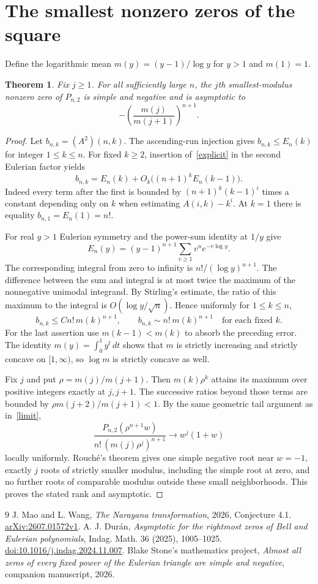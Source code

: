 \documentclass[11pt]{article}
\newtheorem{theorem}{Theorem}
\begin{document}
\section{The smallest nonzero zeros of the square}
Define the logarithmic mean $m(y)=(y-1)/\log y$ for $y>1$ and $m(1)=1$.
\begin{theorem}\label{smallest}
Fix $j\ge1$. For all sufficiently large $n$, the $j$th smallest-modulus nonzero zero of $P_{n,2}$ is simple and negative and is asymptotic to
\[
 -\left(\frac{m(j)}{m(j+1)}\right)^{n+1} .
\]
\end{theorem}
\begin{proof}
Let $b_{n,k}=(A^2)(n,k)$. The ascending-run injection gives $b_{n,k}\le E_n(k)$ for integer $1\le k\le n$. For fixed $k\ge2$, insertion of~\eqref{explicit} in the second Eulerian factor yields
\[
 b_{n,k}=E_n(k)+O_k\big((n+1)^k E_n(k-1)\big).
\]
Indeed every term after the first is bounded by $(n+1)^k(k-1)^i$ times a constant depending only on $k$ when estimating $A(i,k)-k^i$. At $k=1$ there is equality $b_{n,1}=E_n(1)=n!$.

For real $y>1$ Eulerian symmetry and the power-sum identity at $1/y$ give
\[
 E_n(y)=(y-1)^{n+1}\sum_{v\ge1}v^n e^{-v\log y} .
\]
The corresponding integral from zero to infinity is $n!/(\log y)^{n+1}$. The difference between the sum and integral is at most twice the maximum of the nonnegative unimodal integrand. By Stirling's estimate, the ratio of this maximum to the integral is $O(\log y/\sqrt n)$. Hence uniformly for $1\le k\le n$,
\[
  b_{n,k}\le C n!\,m(k)^{n+1},
 \qquad b_{n,k}\sim n!\,m(k)^{n+1}\quad\text{for each fixed }k .
\]
For the last assertion use $m(k-1)<m(k)$ to absorb the preceding error. The identity $m(y)=\int_0^1 y^t\,dt$ shows that $m$ is strictly increasing and strictly concave on $[1,\infty)$, so $\log m$ is strictly concave as well.

Fix $j$ and put $\rho=m(j)/m(j+1)$. Then $m(k)\rho^k$ attains its maximum over positive integers exactly at $j,j+1$. The successive ratios beyond those terms are bounded by $\rho m(j+2)/m(j+1)<1$. By the same geometric tail argument as in~\eqref{limit},
\[
 \frac{P_{n,2}(\rho^{n+1}w)}{n!\,(m(j)\rho^j)^{n+1}}
 \longrightarrow w^j(1+w)
\]
locally uniformly. Rouch\'e's theorem gives one simple negative root near $w=-1$, exactly $j$ roots of strictly smaller modulus, including the simple root at zero, and no further roots of comparable modulus outside these small neighborhoods. This proves the stated rank and asymptotic.
\end{proof}

\begin{thebibliography}{9}
 J. Mao and L. Wang, \emph{The Narayana transformation}, 2026, Conjecture 4.1. \href{https://arxiv.org/abs/2607.01572v1}{arXiv:2607.01572v1}.
 A. J. Dur\'an, \emph{Asymptotic for the rightmost zeros of Bell and Eulerian polynomials}, Indag. Math. 36 (2025), 1005--1025. \href{https://doi.org/10.1016/j.indag.2024.11.007}{doi:10.1016/j.indag.2024.11.007}.
 Blake Stone's mathematics project, \emph{Almost all zeros of every fixed power of the Eulerian triangle are simple and negative}, companion manuscript, 2026.
\end{thebibliography}
\end{document}
